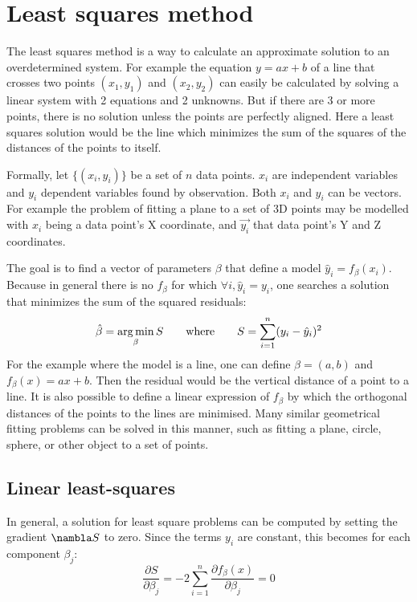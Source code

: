 \section{Least squares method}
The least squares method is a way to calculate an approximate solution to an overdetermined system. For example the equation $y = ax + b$ of a line that crosses two points $(x_1, y_1)$ and $(x_2, y_2)$ can easily be calculated by solving a linear system with 2 equations and 2 unknowns. But if there are 3 or more points, there is no solution unless the points are perfectly aligned. Here a least squares solution would be the line which minimizes the sum of the squares of the distances of the points to itself.

Formally, let $\{ (x_i, y_i) \}$ be a set of $n$ data points. $x_i$ are independent variables and $y_i$ dependent variables found by observation. Both $x_i$ and $y_i$ can be vectors. For example the problem of fitting a plane to a set of 3D points may be modelled with $x_i$ being a data point's X coordinate, and $\vec{y_i}$ that data point's Y and Z coordinates.

The goal is to find a vector of parameters $\beta$ that define a model $\hat{y}_i = f_{\beta}(x_i)$. Because in general there is no $f_{\beta}$ for which $\forall i, \hat{y}_i = y_i$, one searches a solution that minimizes the sum of the squared residuals:
\begin{equation}
\hat{\beta} = \operatorname*{arg\,min}_{\beta} S \hspace{7mm} \text{where} \hspace{7mm} S = \sum_{i=1}^{n} (y_i - \hat{y}_i)^2
\end{equation}
For the example where the model is a line, one can define $\beta = (a, b)$ and $f_{\beta}(x) = ax + b$. Then the residual would be the vertical distance of a point to a line. It is also possible to define a linear expression of $f_{\beta}$ by which the orthogonal distances of the points to the lines are minimised. Many similar geometrical fitting problems can be solved in this manner, such as fitting a plane, circle, sphere, or other object to a set of points. \cite{Eber1999}

\subsection{Linear least-squares}
In general, a solution for least square problems can be computed by setting the gradient $\nambla S$ to zero. Since the terms $y_i$ are constant, this becomes for each component $\beta_j$:
\begin{equation} \label{eq:lsq_sol}
\frac{\partial S }{\partial \beta_j} = -2 \sum_{i=1}^{n} \frac{\partial f_{\beta}(x)}{\partial \beta_j} = 0
\end{equation}

